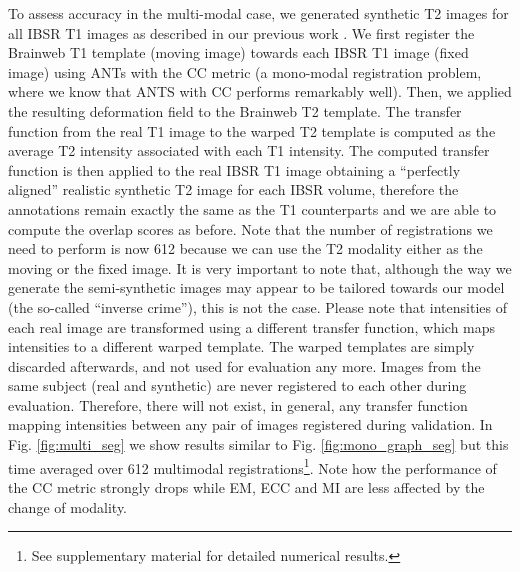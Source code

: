 To assess accuracy in the multi-modal case, we generated synthetic T2 images for all IBSR T1 images as described in our previous work \cite{Ocegueda2015}. We first register the Brainweb T1 template (moving image) towards each IBSR T1 image (fixed image) using ANTs with the CC metric (a mono-modal registration problem, where we know that ANTS with CC performs remarkably well). Then, we applied the resulting deformation field to the Brainweb T2 template. The transfer function from the real T1 image to the warped T2 template is computed as the average T2 intensity associated with each T1 intensity. The computed transfer function is then applied to the real IBSR T1 image obtaining a ``perfectly aligned'' realistic synthetic T2 image for each IBSR volume, therefore the annotations remain exactly the same as the T1 counterparts and we are able to compute the overlap scores as before. Note that the number of registrations we need to perform is now 612 because we can use the T2 modality either as the moving or the fixed image. It is very important to note that, although the way we generate the semi-synthetic images may appear to be tailored towards our model (the so-called ``inverse crime''), this is not the case. Please note that intensities of each real image are transformed using a different transfer function, which maps intensities to a different warped template. The warped templates are simply discarded afterwards, and not used for evaluation any more. Images from the same subject (real and synthetic) are never registered to each other during evaluation. Therefore, there will not exist, in general, any transfer function mapping intensities between any pair of images registered during validation. In Fig. \ref{fig:multi_seg} we show results similar to Fig. \ref{fig:mono_graph_seg} but this time averaged over 612 multimodal registrations\footnote{See supplementary material for detailed numerical results.}. Note how the performance of the CC metric strongly drops while EM, ECC and MI are less affected by the change of modality.\\

